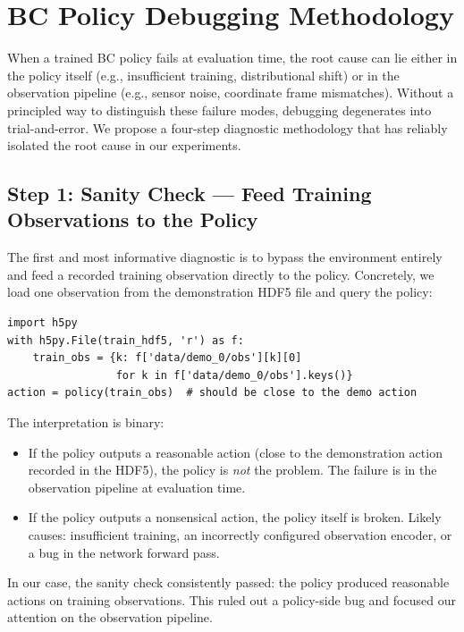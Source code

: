 \section{BC Policy Debugging Methodology}
\label{sec:methodology}

When a trained BC policy fails at evaluation time, the root cause can lie either in the policy itself (e.g., insufficient training, distributional shift) or in the observation pipeline (e.g., sensor noise, coordinate frame mismatches). Without a principled way to distinguish these failure modes, debugging degenerates into trial-and-error. We propose a four-step diagnostic methodology that has reliably isolated the root cause in our experiments.

\subsection{Step 1: Sanity Check --- Feed Training Observations to the Policy}
\label{sec:methodology:sanity}

The first and most informative diagnostic is to bypass the environment entirely and feed a recorded training observation directly to the policy. Concretely, we load one observation from the demonstration HDF5 file and query the policy:

\begin{lstlisting}[caption={Sanity check: feed a training observation to the policy.}]
import h5py
with h5py.File(train_hdf5, 'r') as f:
    train_obs = {k: f['data/demo_0/obs'][k][0]
                 for k in f['data/demo_0/obs'].keys()}
action = policy(train_obs)  # should be close to the demo action
\end{lstlisting}

The interpretation is binary:
\begin{itemize}[leftmargin=*,itemsep=2pt]
    \item If the policy outputs a reasonable action (close to the demonstration action recorded in the HDF5), the policy is \emph{not} the problem. The failure is in the observation pipeline at evaluation time.
    \item If the policy outputs a nonsensical action, the policy itself is broken. Likely causes: insufficient training, an incorrectly configured observation encoder, or a bug in the network forward pass.
\end{itemize}

In our case, the sanity check consistently passed: the policy produced reasonable actions on training observations. This ruled out a policy-side bug and focused our attention on the observation pipeline.


